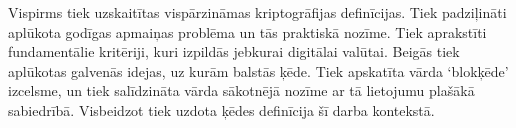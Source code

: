Vispirms tiek uzskaitītas vispārzināmas kriptogrāfijas definīcijas. 
Tiek padziļināti aplūkota godīgas apmaiņas problēma un tās praktiskā nozīme. Tiek aprakstīti fundamentālie kritēriji, kuri izpildās jebkurai digitālai valūtai. Beigās tiek aplūkotas galvenās idejas, uz kurām balstās ķēde. Tiek apskatīta vārda `blokķēde' izcelsme, un tiek salīdzināta vārda sākotnējā nozīme ar tā lietojumu plašākā sabiedrībā. Visbeidzot tiek uzdota ķēdes definīcija šī darba kontekstā.
